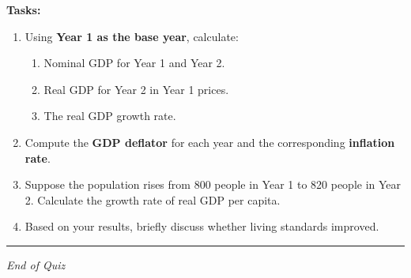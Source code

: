 \documentclass[12pt]{article}
\begin{document}
\textbf{Tasks:}
\begin{enumerate}
    \item[(a)] Using \textbf{Year 1 as the base year}, calculate:
        \begin{enumerate}
            \item Nominal GDP for Year 1 and Year 2.
            \item Real GDP for Year 2 in Year 1 prices.
            \item The real GDP growth rate.
        \end{enumerate}

    \item[(b)] Compute the \textbf{GDP deflator} for each year and the corresponding \textbf{inflation rate}.

    \item[(c)] Suppose the population rises from 800 people in Year 1 to 820 people in Year 2.  
    Calculate the growth rate of real GDP per capita.

    \item[(d)] Based on your results, briefly discuss whether living standards improved.
\end{enumerate}


\vspace{1em}
\hrule
\vspace{7 cm}

\begin{center}
\textit{End of Quiz}
\end{center}
\end{document}
